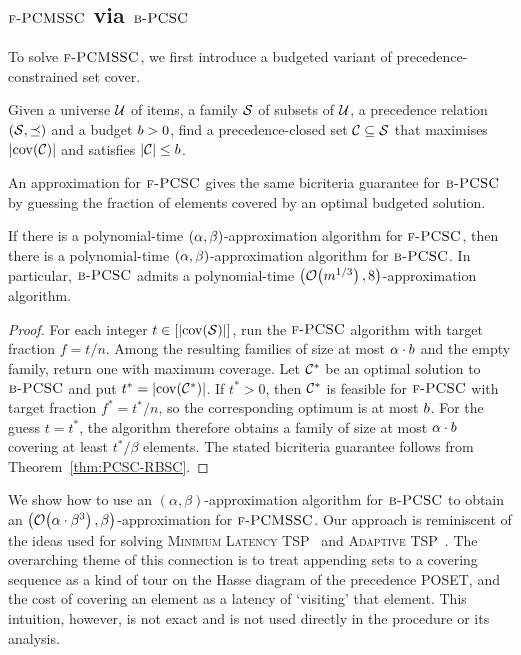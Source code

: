 \subsection{\texorpdfstring{$\textup{\textsc{f-PCMSSC}}$ via $\textup{\textsc{b-PCSC}}$}{PCMSSC via B-PCSC}} \label{subsection:PCMSSC}
To solve $\textup{\textsc{f-PCMSSC}}$, we first introduce a budgeted variant of precedence-constrained set cover.
\begin{problem} \label{problem:BPCSC}
Given a universe $\mathcal{U}$ of items, a family $\mathcal{S}$ of subsets of $\mathcal{U}$, a precedence relation $(\mathcal{S},\preceq)$ and a budget $b>0$, find a precedence-closed set $\mathcal{C}\subseteq\mathcal{S}$ that maximises $\mathopen{}\left| \operatorname{cov}\mathopen{}\left( \mathcal{C} \right) \right|$ and satisfies $\mathopen{}\left| \mathcal{C} \right|\leq b$.
\end{problem}

An approximation for $\textup{\textsc{f-PCSC}}$ gives the same bicriteria guarantee for $\textup{\textsc{b-PCSC}}$ by guessing the fraction of elements covered by an optimal budgeted solution.
\begin{theorem}\label{thm:PCSC-to-BPCSC}\label{thm:BPCSC}
If there is a polynomial-time $\mathopen{}\left( \alpha,\beta \right)$-approximation algorithm for $\textup{\textsc{f-PCSC}}$, then there is a polynomial-time $\mathopen{}\left( \alpha,\beta \right)$-approximation algorithm for $\textup{\textsc{b-PCSC}}$. In particular, $\textup{\textsc{b-PCSC}}$ admits a polynomial-time $\mathopen{}\left( \mathcal{O}\mathopen{}\left( m^{1/3} \right),8 \right)$-approximation algorithm.
\end{theorem}
\begin{proof}
For each integer $t\in[\mathopen{}\left| \operatorname{cov}\mathopen{}\left( \mathcal{S} \right) \right|]$, run the $\textup{\textsc{f-PCSC}}$ algorithm with target fraction $f=t/n$. Among the resulting families of size at most $\alpha\cdot b$ and the empty family, return one with maximum coverage.
Let $\mathcal{C}^{*}$ be an optimal solution to $\textup{\textsc{b-PCSC}}$ and put $t^*=\mathopen{}\left| \operatorname{cov}\mathopen{}\left( \mathcal{C}^{*} \right) \right|$. If $t^*>0$, then $\mathcal{C}^{*}$ is feasible for $\textup{\textsc{f-PCSC}}$ with target fraction $f^*=t^*/n$, so the corresponding optimum is at most $b$. For the guess $t=t^*$, the algorithm therefore obtains a family of size at most $\alpha\cdot b$ covering at least $t^*/\beta$ elements. The stated bicriteria guarantee follows from Theorem~\ref{thm:PCSC-RBSC}.
\end{proof}

We show how to use an $(\alpha,\beta)$-approximation algorithm for $\textup{\textsc{b-PCSC}}$ to obtain an $\mathopen{}\left( \mathcal{O}\mathopen{}\left( \alpha\cdot\beta^3 \right), \beta \right)$-approximation for $\textup{\textsc{f-PCMSSC}}$.  Our approach is reminiscent of the ideas used for solving \textup{\textsc{Minimum Latency TSP}}~\cite{PathsTreesMinimumLatencyTours,KTravelingRepairmenProblem} and \textup{\textsc{Adaptive TSP}}~\cite{ApproxAlgsForOptDTsAndAdapTSPProblems}. The overarching theme of this connection is to treat appending sets to a covering sequence as a kind of tour on the Hasse diagram of the precedence POSET, and the cost of covering an element as a latency of `visiting' that element. This intuition, however, is not exact and is not used directly in the procedure or its analysis.

